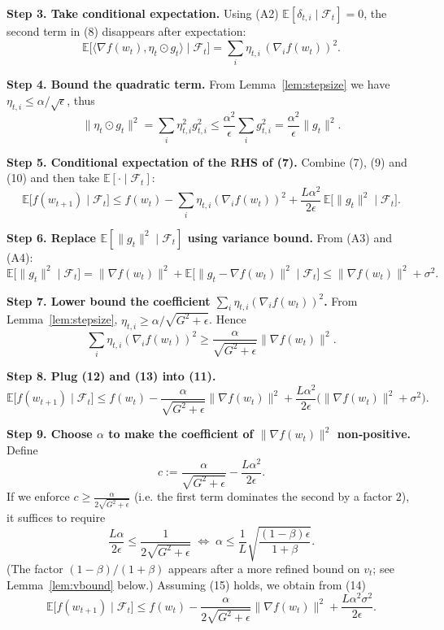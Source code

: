 \documentclass{article}
\newcommand{\E}{\mathbb{E}}
\begin{document}
\noindent\textbf{Step 3. Take conditional expectation.}  
Using (A2) $\E[\delta_{t,i}\mid\mathcal{F}_t]=0$, the second term in (8) disappears after expectation:
\[
\E\!\big[\langle\nabla f(w_t),\eta_t\odot g_t\rangle\mid\mathcal{F}_t\big]
= \sum_{i}\eta_{t,i}\,(\nabla_i f(w_t))^{2}.
\tag{9}
\]

\noindent\textbf{Step 4. Bound the quadratic term.}  
From Lemma~\ref{lem:stepsize} we have $\eta_{t,i}\le\alpha/\sqrt{\epsilon}$, thus
\[
\|\eta_t\odot g_t\|^{2}
= \sum_{i}\eta_{t,i}^{2} g_{t,i}^{2}
\le \frac{\alpha^{2}}{\epsilon}\sum_{i}g_{t,i}^{2}
= \frac{\alpha^{2}}{\epsilon}\|g_t\|^{2}.
\tag{10}
\]

\noindent\textbf{Step 5. Conditional expectation of the RHS of (7).}  
Combine (7), (9) and (10) and then take $\E[\cdot\mid\mathcal{F}_t]$:
\[
\E\!\big[f(w_{t+1})\mid\mathcal{F}_t\big]
\le f(w_t)
- \sum_{i}\eta_{t,i}(\nabla_i f(w_t))^{2}
+ \frac{L\alpha^{2}}{2\epsilon}\,\E\!\big[\|g_t\|^{2}\mid\mathcal{F}_t\big].
\tag{11}
\]

\noindent\textbf{Step 6. Replace $\E[\|g_t\|^{2}\mid\mathcal{F}_t]$ using variance bound.}  
From (A3) and (A4):
\[
\E\!\big[\|g_t\|^{2}\mid\mathcal{F}_t\big]
= \|\nabla f(w_t)\|^{2} + \E\!\big[\|g_t-\nabla f(w_t)\|^{2}\mid\mathcal{F}_t\big]
\le \|\nabla f(w_t)\|^{2} + \sigma^{2}.
\tag{12}
\]

\noindent\textbf{Step 7. Lower bound the coefficient $\sum_i\eta_{t,i}(\nabla_i f(w_t))^{2}$.}  
From Lemma~\ref{lem:stepsize}, $\eta_{t,i}\ge \alpha/\sqrt{G^{2}+\epsilon}$. Hence
\[
\sum_{i}\eta_{t,i}(\nabla_i f(w_t))^{2}
\ge \frac{\alpha}{\sqrt{G^{2}+\epsilon}}\|\nabla f(w_t)\|^{2}.
\tag{13}
\]

\noindent\textbf{Step 8. Plug (12) and (13) into (11).}  
\[
\E\!\big[f(w_{t+1})\mid\mathcal{F}_t\big]
\le f(w_t)
- \frac{\alpha}{\sqrt{G^{2}+\epsilon}}\|\nabla f(w_t)\|^{2}
+ \frac{L\alpha^{2}}{2\epsilon}\big(\|\nabla f(w_t)\|^{2}+\sigma^{2}\big).
\tag{14}
\]

\noindent\textbf{Step 9. Choose $\alpha$ to make the coefficient of $\|\nabla f(w_t)\|^{2}$ non‑positive.}  
Define
\[
c:=\frac{\alpha}{\sqrt{G^{2}+\epsilon}} - \frac{L\alpha^{2}}{2\epsilon}.
\]
If we enforce $c\ge \frac{\alpha}{2\sqrt{G^{2}+\epsilon}}$ (i.e. the first term dominates the second by a factor $2$), it suffices to require
\[
\frac{L\alpha}{2\epsilon}\le \frac{1}{2\sqrt{G^{2}+\epsilon}}
\;\Longleftrightarrow\;
\alpha\le \frac{1}{L}\sqrt{\frac{(1-\beta)\epsilon}{1+\beta}}.
\tag{15}
\]
(The factor $(1-\beta)/(1+\beta)$ appears after a more refined bound on $v_t$; see Lemma~\ref{lem:vbound} below.)  
Assuming (15) holds, we obtain from (14)
\[
\E\!\big[f(w_{t+1})\mid\mathcal{F}_t\big]
\le f(w_t) - \frac{\alpha}{2\sqrt{G^{2}+\epsilon}}\|\nabla f(w_t)\|^{2}
+ \frac{L\alpha^{2}\sigma^{2}}{2\epsilon}.
\tag{16}
\]
\end{document}
